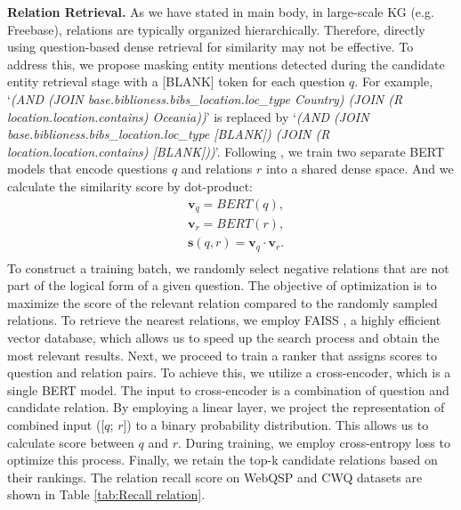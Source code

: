 \textbf{Relation Retrieval.}
As we have stated in main body, in large-scale KG (e.g. Freebase), relations are typically organized hierarchically. Therefore, directly using question-based dense retrieval for similarity may not be effective. To address this, we propose masking entity mentions detected during the candidate entity retrieval stage with a [BLANK] token for each question $q$. For example, `\textit{(AND (JOIN base.biblioness.bibs\_location.loc\_type Country) (JOIN (R location.location.contains) Oceania))}' is replaced by `\textit{(AND (JOIN base.biblioness.bibs\_location.loc\_type [BLANK]) (JOIN (R location.location.contains) [BLANK]))}'. Following \citet{GMT-KBQA,CBR-KBQA}, we train two separate BERT \cite{devlin2018bert} models that encode questions $q$ and relations $r$ into a shared dense space. And we calculate the similarity score by dot-product:
 \begin{equation}
\begin{aligned}
    &\boldsymbol{v}_{q} = BERT(q), \\
   &\boldsymbol{v}_{r} = BERT(r), \\
    &\boldsymbol{s}(q,r) = \boldsymbol{v}_{q} \cdot \boldsymbol{v}_{r}. \\
\end{aligned}
\end{equation}
To construct a training batch, we randomly select negative relations that are not part of the logical form of a given question. The objective of optimization is to maximize the score of the relevant relation compared to the randomly sampled relations. 
 To retrieve the nearest relations, we employ FAISS \cite{douze2024faiss}, a highly efficient vector database, which allows us to speed up the search process and obtain the most relevant results. 
Next, we proceed to train a ranker that assigns scores to question and relation pairs. To achieve this, we utilize a cross-encoder, which is a single BERT model. The input to cross-encoder is a combination of question and candidate relation. By employing a linear layer, we project the representation of combined input ([$q$; $r$]) to a binary probability distribution. This allows us to calculate score between $q$ and $r$. During training, we employ cross-entropy loss to optimize this process. Finally, we retain the top-k candidate relations based on their rankings.
The relation recall score on WebQSP and CWQ datasets are shown in Table \ref{tab:Recall relation}.

